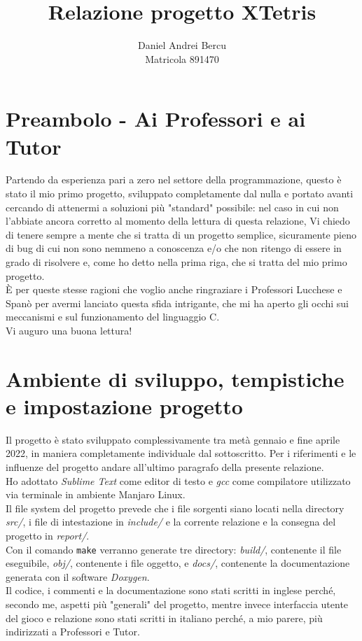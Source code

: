 \documentclass[a4paper]{article}
\title{Relazione progetto XTetris}
\author{Daniel Andrei Bercu \\Matricola 891470}
\date{}
\begin{document}
\maketitle

\section{Preambolo - Ai Professori e ai Tutor}
Partendo da esperienza pari a zero nel settore della programmazione, questo è stato il mio primo progetto, sviluppato completamente dal nulla e portato avanti cercando di attenermi a soluzioni più "standard" possibile: nel caso in cui non l'abbiate ancora corretto al momento della lettura di questa relazione, Vi chiedo di tenere sempre a mente che si tratta di un progetto semplice, sicuramente pieno di bug di cui non sono nemmeno a conoscenza e/o che non ritengo di essere in grado di risolvere e, come ho detto nella prima riga, che si tratta del mio primo progetto.\\
È per queste stesse ragioni che voglio anche ringraziare i Professori Lucchese e Spanò per avermi lanciato questa sfida intrigante, che mi ha aperto gli occhi sui meccanismi e sul funzionamento del linguaggio C.\\
Vi auguro una buona lettura!

\section{Ambiente di sviluppo, tempistiche e impostazione progetto}
Il progetto è stato sviluppato complessivamente tra metà gennaio e fine aprile 2022, in maniera completamente individuale dal sottoscritto. Per i riferimenti e le influenze del progetto andare all'ultimo paragrafo della presente relazione.\\
Ho adottato \textit{Sublime Text} come editor di testo e \textit{gcc} come compilatore utilizzato via terminale in ambiente Manjaro Linux.\\
Il file system del progetto prevede che i file sorgenti siano locati nella directory \textit{src/}, i file di intestazione in \textit{include/} e la corrente relazione e la consegna del progetto in \textit{report/}.\\
Con il comando \texttt{make} verranno generate tre directory: \textit{build/}, contenente il file eseguibile, \textit{obj/}, contenente i file oggetto, e \textit{docs/}, contenente la documentazione generata con il software \textit{Doxygen}.\\
Il codice, i commenti e la documentazione sono stati scritti in inglese perché, secondo me, aspetti più "generali" del progetto, mentre invece interfaccia utente del gioco e relazione sono stati scritti in italiano perché, a mio parere, più indirizzati a Professori e Tutor.
\end{document}

